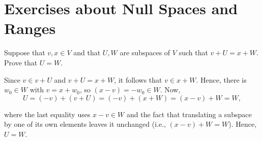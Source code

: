 \section*{Exercises about Null Spaces and Ranges}

\begin{xrcs}
  Suppose that $v, x \in V$ and that $U, W$ are subspaces of $V$ such that $v + U = x + W$. Prove that $U = W$.
  \begin{xprf}
    Since $v \in v + U$ and $v+U = x + W$, it follows that $v \in x + W$. Hence, there is  $w_0 \in W$ with $v = x + w_0$, so $(x-v) = -w_0 \in W$. Now,
    \begin{equation}
      U = (-v) + (v+U) = (-v) + (x + W) = (x-v) + W = W,
    \end{equation}

    where the last equality uses $x-v \in W$ and the fact that translating a subspace by one of its own elements leaves it unchanged (i.e., $(x-v) + W = W$). Hence, $U = W$.
  \end{xprf}
\end{xrcs}

